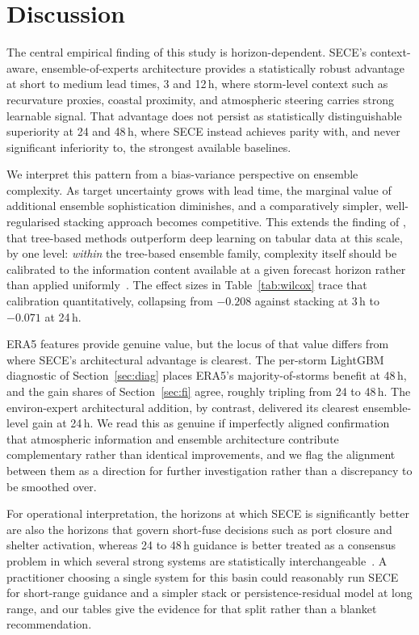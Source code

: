 \documentclass{ametsocv6.1}
\newcommand{\sece}{SECE}
\newcommand{\era}{ERA5}
\begin{document}
\section{Discussion}
\label{sec:discussion}
The central empirical finding of this study is horizon-dependent. \sece{}'s
context-aware, ensemble-of-experts architecture provides a statistically robust
advantage at short to medium lead times, 3 and 12\,h, where storm-level context
such as recurvature proxies, coastal proximity, and atmospheric steering carries
strong learnable signal. That advantage does not persist as statistically
distinguishable superiority at 24 and 48\,h, where \sece{} instead achieves parity
with, and never significant inferiority to, the strongest available baselines.

We interpret this pattern from a bias-variance perspective on ensemble complexity.
As target uncertainty grows with lead time, the marginal value of additional
ensemble sophistication diminishes, and a comparatively simpler, well-regularised
stacking approach becomes competitive. This extends the finding of \citet{grinsztajn2022tree}, that tree-based methods
outperform deep learning on
tabular data at this scale, by one level: \emph{within} the tree-based ensemble
family, complexity itself should be calibrated to the information content
available at a given forecast horizon rather than applied
uniformly~\citep{ganaie2022ensemble}. The effect sizes in
Table~\ref{tab:wilcox} trace that calibration quantitatively, collapsing from
$-0.208$ against stacking at 3\,h to $-0.071$ at 24\,h.

\era{} features provide genuine value, but the locus of that value differs from
where \sece{}'s architectural advantage is clearest. The per-storm LightGBM
diagnostic of Section~\ref{sec:diag} places \era{}'s majority-of-storms benefit at
48\,h, and the gain shares of Section~\ref{sec:fi} agree, roughly tripling from 24
to 48\,h. The environ-expert architectural addition, by contrast, delivered its
clearest ensemble-level gain at 24\,h. We read this as genuine if imperfectly
aligned confirmation that atmospheric information and ensemble architecture
contribute complementary rather than identical improvements, and we flag the
alignment between them as a direction for further investigation rather than a
discrepancy to be smoothed over.

For operational interpretation, the horizons at which \sece{} is significantly
better are also the horizons that govern short-fuse decisions such as port
closure and shelter activation, whereas 24 to 48\,h guidance is better treated as
a consensus problem in which several strong systems are statistically
interchangeable~\citep{goerss2000tropical,goerss2004tropical}. A practitioner
choosing a single system for this basin could reasonably run \sece{} for
short-range guidance and a simpler stack or persistence-residual model at long
range, and our tables give the evidence for that split rather than a blanket
recommendation.
\end{document}
